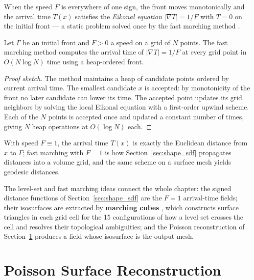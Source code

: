 When the speed $F$ is everywhere of one sign, the front moves monotonically and
the arrival time $T(x)$ satisfies the \emph{Eikonal equation}
$|\nabla T| = 1/F$ with $T = 0$ on the initial front --- a static problem
solved once by the fast marching method \cite{sethian1996}.

\begin{theorem}\label{thm:shape_fast_marching}
  Let $\Gamma$ be an initial front and $F > 0$ a speed on a grid of $N$ points.
  The fast marching method computes the arrival time of $|\nabla T| = 1/F$ at
  every grid point in $O(N \log N)$ time using a heap-ordered front.
\end{theorem}

\begin{proof}[Proof sketch]
  The method maintains a heap of candidate points ordered by current arrival
  time. The smallest candidate $x$ is accepted: by monotonicity of the front no
  later candidate can lower its time. The accepted point updates its grid
  neighbors by solving the local Eikonal equation with a first-order upwind
  scheme. Each of the $N$ points is accepted once and updated a constant number
  of times, giving $N$ heap operations at $O(\log N)$ each.
\end{proof}

\begin{example}
  With speed $F \equiv 1$, the arrival time $T(x)$ is exactly the Euclidean
  distance from $x$ to $\Gamma$; fast marching with $F = 1$ is how
  Section~\ref{sec:shape_sdf} propagates distances into a volume grid, and the
  same scheme on a surface mesh yields geodesic distances.
\end{example}

The level-set and fast marching ideas connect the whole chapter: the signed
distance functions of Section~\ref{sec:shape_sdf} are the $F = 1$
arrival-time fields; their isosurfaces are extracted by \textbf{marching
cubes} \cite{lorensen1987}, which constructs surface triangles in each grid
cell for the 15 configurations of how a level set crosses the cell and resolves
their topological ambiguities; and the Poisson reconstruction of
Section~\ref{sec:shape_poisson_reconstruction} produces a field whose isosurface
is the output mesh.


\section{Poisson Surface Reconstruction}
\label{sec:shape_poisson_reconstruction}

